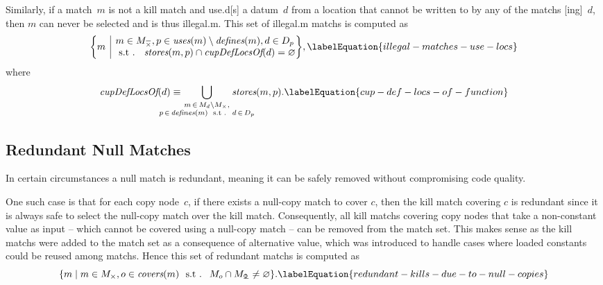 Similarly, if a \gls{match}~$m$ is not a \gls{kill match} and \gls{use.d}[s] a
\gls{datum}~$d$ from a location that cannot be written to by any of the
\glspl{match} [ing]~$d$, then $m$ can never be selected and
is thus \gls{illegal.m}.
%
This set of \gls{illegal.m} \glspl{match} is computed as
%
\begin{equation}
  \mSetBuilder*{m}%
               {%
                 \begin{array}{@{}l@{}}
                   m \in \mKillMatchCompSet,
                   p \in \mUses(m) \setminus \mDefines(m),
                   d \in \mDataSet[p] \hspace{-1pt} \\
                   \text{\st }
                   \mStores(m, p) \cap \mCupDefLocsOf(d) = \mEmptySet
                 \end{array}
               } \!,
  \labelEquation{illegal-matches-use-locs}
\end{equation}
%
where
%
\begin{equation}
  \mCupDefLocsOf(d)
  \equiv
  \hspace{-2.5em}
  \bigcup_{\substack{%
                   m \, \in \, \mMatchSet[d] \setminus \mKillMatchSet, \\
                   p \, \in \, \mDefines(m)
                   \text{ \st } d \, \in \, \mDataSet[p]
                  }}
    \hspace{-2.5em}
    \mStores(m, p).
  \labelEquation{cup-def-locs-of-function}
\end{equation}


\subsection{Redundant Null Matches}

In certain circumstances a \gls{null match} is redundant, meaning it can be
safely removed without compromising code quality.

One such case is that for each \gls{copy node}~$c$, if there exists a
\gls{null-copy match} to cover $c$, then the \gls{kill match} covering $c$ is
redundant since it is always safe to select the \gls{null-copy match} over the
\gls{kill match}.
%
Consequently, all \glspl{kill match} covering \glspl{copy node} that take a
non-constant value as input -- which cannot be covered using a \gls{null-copy
  match} -- can be removed from the \gls{match set}.
%
This makes sense as the \glspl{kill match} were added to the \gls{match set} as
a consequence of \gls{alternative value}, which was introduced to handle cases
where loaded constants could be reused among \glspl{match}.
%
Hence this set of redundant \glspl{match} is computed as
%
\begin{equation}
  \mSetBuilder{m}%
              {%
                m \in \mKillMatchSet,
                o \in \mCovers(m)
                \text{ \st }
                \mMatchSet[o] \cap \mNullCopyMatchSet \neq \mEmptySet
              }.
  \labelEquation{redundant-kills-due-to-null-copies}
\end{equation}


